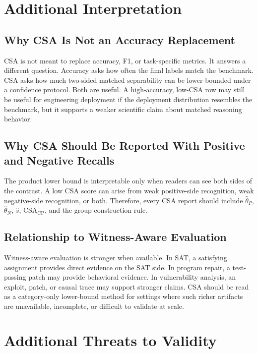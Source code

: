 \documentclass[10pt,conference]{IEEEtran}
\theoremstyle{remark}
\newcommand{\CSACP}{\mathrm{CSA}_{\mathrm{CP}}}
\begin{document}
\section{Additional Interpretation}
\label{sec:supp-interpretation}

\subsection{Why CSA Is Not an Accuracy Replacement}

CSA is not meant to replace accuracy, F1, or task-specific metrics.  It answers a different question.  Accuracy asks how often the final labels match the benchmark.  CSA asks how much two-sided matched separability can be lower-bounded under a confidence protocol.  Both are useful.  A high-accuracy, low-CSA row may still be useful for engineering deployment if the deployment distribution resembles the benchmark, but it supports a weaker scientific claim about matched reasoning behavior.

\subsection{Why CSA Should Be Reported With Positive and Negative Recalls}

The product lower bound is interpretable only when readers can see both sides of the contrast.  A low CSA score can arise from weak positive-side recognition, weak negative-side recognition, or both.  Therefore, every CSA report should include $\hat\theta_P$, $\hat\theta_N$, $\hat{s}$, $\CSACP$, and the group construction rule.

\subsection{Relationship to Witness-Aware Evaluation}

Witness-aware evaluation is stronger when available.  In SAT, a satisfying assignment provides direct evidence on the SAT side.  In program repair, a test-passing patch may provide behavioral evidence.  In vulnerability analysis, an exploit, patch, or causal trace may support stronger claims.  CSA should be read as a category-only lower-bound method for settings where such richer artifacts are unavailable, incomplete, or difficult to validate at scale.

\section{Additional Threats to Validity}
\label{sec:supp-threats}
\end{document}
